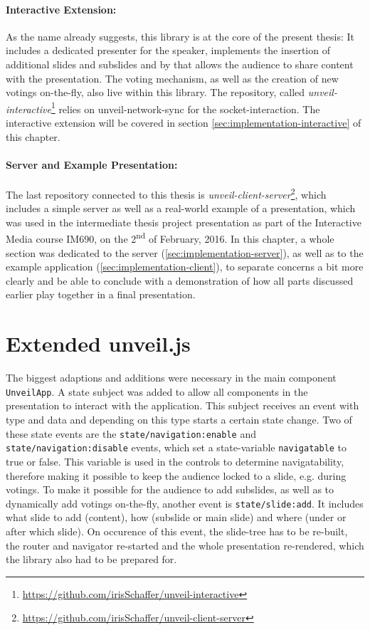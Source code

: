 \paragraph{Interactive Extension:} As the name already suggests, this library is at the core of the present thesis: It includes a dedicated presenter for the speaker, implements the insertion of additional slides and subslides and by that allows the audience to share content with the presentation. The voting mechanism, as well as the creation of new votings on-the-fly, also live within this library. The repository, called \emph{unveil-interactive}\footnote{\url{https://github.com/irisSchaffer/unveil-interactive}} relies on unveil-network-sync for the socket-interaction. The interactive extension will be covered in section \ref{sec:implementation-interactive} of this chapter.

\paragraph{Server and Example Presentation:} The last repository connected to this thesis is \emph{unveil-client-server}\footnote{\url{https://github.com/irisSchaffer/unveil-client-server}}, which includes a simple server as well as a real-world example of a presentation, which was used in the intermediate thesis project presentation as part of the Interactive Media course IM690, on the 2\textsuperscript{nd}\xspace of February, 2016. In this chapter, a whole section was dedicated to the server (\ref{sec:implementation-server}), as well as to the example application (\ref{sec:implementation-client}), to separate concerns a bit more clearly and be able to conclude with a demonstration of how all parts discussed earlier play together in a final presentation.

\section{Extended unveil.js}
\label{sec:implementation-unveil}
The biggest adaptions and additions were necessary in the main component \texttt{UnveilApp}. A state subject was added to allow all components in the presentation to interact with the application. This subject receives an event with type and data and depending on this type starts a certain state change. Two of these state events are the \texttt{state/navigation:enable} and \texttt{state/navigation:disable} events, which set a state-variable \texttt{navigatable} to true or false. This variable is used in the controls to determine navigatability, therefore making it possible to keep the audience locked to a slide, e.g. during votings.
To make it possible for the audience to add subslides, as well as to dynamically add votings on-the-fly, another event is \texttt{state/slide:add}. It includes what slide to add (content), how (subslide or main slide) and where (under or after which slide). On occurence of this event, the slide-tree has to be re-built, the router and navigator re-started and the whole presentation re-rendered, which the library also had to be prepared for.

